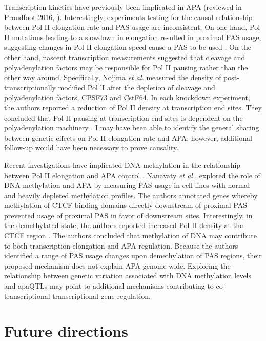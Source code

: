 Transcription kinetics have previously been implicated in APA (reviewed in Proudfoot 2016, \citep{proudfoot_transcriptional_2016}). Interestingly, experiments testing for the causal relationship between Pol II elongation rate and PAS usage are inconsistent. On one hand, Pol II mutations leading to a slowdown in elongation resulted in proximal PAS usage, suggesting changes in Pol II elongation speed cause a PAS to be used \citep{pinto_rna_2011, kornblihtt_chromatin_2006, de_la_mata_slow_2003, howe_perturbation_2003}. On the other hand, nascent transcription measurements suggested that cleavage and polyadenylation factors may be responsible for Pol II pausing rather than the other way around. Specifically, Nojima \emph{et al.} measured the density of post-transcriptionally modified Pol lI after the depletion of cleavage and polyadenylation factors, CPSF73 and CstF64. In each knockdown experiment, the authors reported a reduction of Pol II density at transcription end sites. They concluded that Pol II pausing at transcription end sites is dependent on the polyadenylation machinery \citep{nojima_mammalian_2015}. I may have been able to identify the general sharing between genetic effects on Pol II elongation rate and APA; however, additional follow-up would have been necessary to prove causality. 

Recent investigations have implicated DNA methylation in the relationship between Pol II elongation and APA control \citep{nanavaty_dna_2020}. Nanavaty \emph{et al.}, explored the role of DNA methylation and APA by measuring PAS usage in cell lines with normal and heavily depleted methylation profiles. The authors annotated genes whereby methylation of CTCF binding domains directly downstream of proximal PAS prevented usage of proximal PAS in favor of downstream sites. Interestingly, in the demethylated state, the authors reported increased Pol II density at the CTCF region \citep{nanavaty_dna_2020}. The authors concluded that methylation of DNA may contribute to both transcription elongation and APA regulation. Because the authors identified a range of PAS usage changes upon demethylation of PAS regions, their proposed mechanism does not explain APA genome wide. Exploring the relationship between genetic variation associated with DNA methylation levels and apaQTLs may point to additional mechanisms contributing to co-transcriptional transcriptional gene regulation. 

\section{Future directions}

